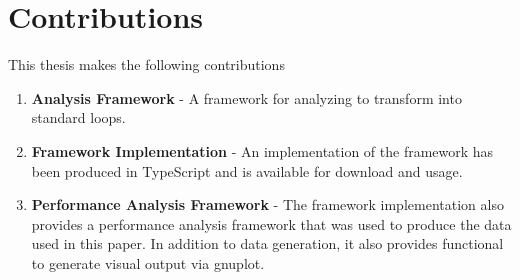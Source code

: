 \section{Contributions}
This thesis makes the following contributions
\begin{enumerate}
  \item \textbf{Analysis Framework} - A framework for analyzing \javascript to transform \pipelines into standard  loops.
  \item \textbf{Framework Implementation} - An implementation\cite{fpo16} of the framework has been produced in TypeScript and is available for download and usage.
  \item \textbf{Performance Analysis Framework} - The framework implementation\cite{fpo16} also provides a performance analysis framework that was used to produce the data used in this paper.  In addition to data generation, it also provides functional to generate visual output via gnuplot.   
\end{enumerate}